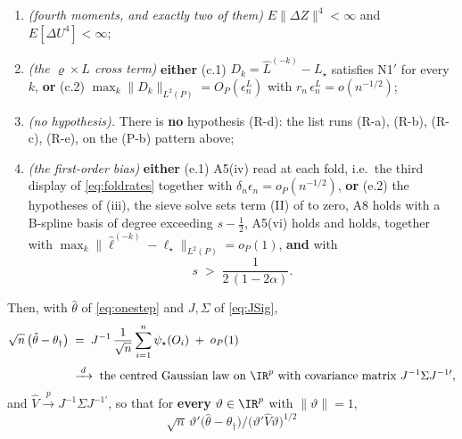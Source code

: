\begin{theorem}
\begin{enumerate}
\item[(R-b)] \emph{(fourth moments, and exactly two of them)} $E\|\Delta Z\|^{4}<\infty$ and
$E[\Delta U^{4}]<\infty$;
\item[(R-c)] \emph{(the $\varrho\times L$ cross term)} \textbf{either} \textup{(c.1)} $D_k=\hat L^{(-k)}-L_\star$
satisfies N1$'$ for every $k$, \textbf{or} \textup{(c.2)}
$\max_k\|D_k\|_{L^{2}(P)}=O_P(\epsilon^{L}_n)$ with $r_n\,\epsilon^{L}_n=o(n^{-1/2})$;
\item[(R-d)] \emph{(no hypothesis).} There is \textbf{no} hypothesis (R-d): the list runs (R-a), (R-b),
(R-c), (R-e), on the \textup{(P-b)} pattern above;
\item[(R-e)] \emph{(the first-order bias)} \textbf{either} \textup{(e.1)} A5(iv) read at each fold, i.e.\ the
third display of \eqref{eq:foldrates} together with $\delta_n\epsilon_n=o_P(n^{-1/2})$, \textbf{or}
\textup{(e.2)} the hypotheses of \textup{(iii)}, the sieve solve sets term
\textup{(II)} of  to zero, A8 holds with a B-spline basis of degree exceeding
$s-\tfrac12$, A5(vi) holds and  holds, together with
$\max_k\|\hat\ell^{(-k)}-\ell_\star\|_{L^{2}(P)}=o_P(1)$, \textbf{and} with
\begin{equation}\label{eq:re2window}
s\;>\;\frac{1}{2\,(1-2\alpha)} .
\end{equation}
\end{enumerate}
Then, with $\hat\theta$ of \eqref{eq:onestep} and $J,\Sigma$ of \eqref{eq:JSig},
\begin{equation}\label{eq:rootn}
\begin{split}
\sqrt n\,\big(\hat\theta-\theta_\dagger\big)
&\;=\;J^{-1}\,\frac1{\sqrt n}\sum_{i=1}^{n}\psi_\star(O_i)\;+\;o_P(1)\\[2pt]
&\;\xrightarrow{\;d\;}\;\text{the centred Gaussian law on }\IR^{p}\text{ with covariance matrix }
J^{-1}\Sigma J^{-1\prime} ,
\end{split}
\end{equation}
and $\hat V\xrightarrow{p}J^{-1}\Sigma J^{-1\prime}$, so that for \textbf{every} $\vartheta\in\IR^{p}$ with
$\|\vartheta\|=1$,
\[
\sqrt n\,\vartheta'\big(\hat\theta-\theta_\dagger\big)\big/\big(\vartheta'\hat V\vartheta\big)^{1/2}
\]
\end{theorem}
